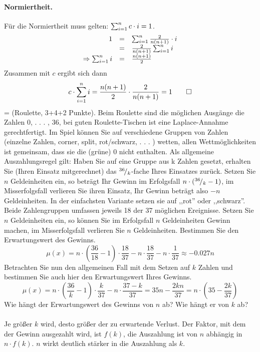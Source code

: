 \documentclass[twoside]{article}
\begin{document}
	\paragraph{Normiertheit.}
	Für die Normiertheit muss gelten: $\sum_{i= 1}^{n}c\cdot i=1$.
	\begin{equation*}
		\begin{array}{rll}
			1 	&=&	\sum_{i= 1}^{n} \frac{2}{n(n+1)}\cdot i\\
				&=&	\frac{2}{n(n+1)}\sum_{i= 1}^{n}i\\
				\Rightarrow \sum_{i= 1}^{n}i	&=& \frac{n(n+1)}{2}
		\end{array}
	\end{equation*}
	Zusammen mit $c$ ergibt sich dann
	\[
		c \cdot \sum_{i= 1}^{n}i = \frac{n(n+1)}{2} \cdot \frac{2}{n(n+1)} = 1 \qed
	\]
\fi
\ifnum\ZettelSechs=\True
{}
(Roulette, 3+4+2 Punkte).
Beim Roulette sind die möglichen Ausgänge die Zahlen {0, . . . , 36}, bei guten Roulette-Tischen ist eine Laplace-Annahme gerechtfertigt.
Im Spiel können Sie auf verschiedene Gruppen von Zahlen (einzelne Zahlen, corner, split, rot/schwarz, . . . ) wetten, allen Wettmöglichkeiten ist gemeinsam, dass sie die (grüne) 0 nicht enthalten.
Als allgemeine Auszahlungsregel gilt: Haben Sie auf eine Gruppe aus k Zahlen gesetzt, erhalten Sie (Ihren Einsatz mitgerechnet) das ${}^{36}\!/_{k}$-fache Ihres Einsatzes zurück.
Setzen Sie $n$ Geldeinheiten ein, so beträgt Ihr Gewinn im Erfolgsfall $n \cdot ({}^{36}\!/_{k}-1)$, im Misserfolgsfall verlieren Sie ihren Einsatz, Ihr Gewinn beträgt also $-n$ Geldeinheiten.
In der einfachsten Variante setzen sie auf ,,rot'' oder ,,schwarz''.
Beide Zahlengruppen umfassen jeweils 18 der 37 möglichen Ereignisse.
Setzen Sie $n$ Geldeinheiten ein, so können Sie im Erfolgsfall $n$ Geldeinheiten Gewinn machen, im Misserfolgsfall verlieren Sie $n$ Geldeinheiten.
Bestimmen Sie den Erwartungswert des Gewinns.
\[
	\mu(x) = n \cdot \left(\frac{36}{18}-1 \right) \cdot \frac{18}{37} - n \cdot \frac{18}{37} - n \cdot \frac{1}{37} \approx -0.027n
\]
Betrachten Sie nun den allgemeinen Fall mit dem Setzen auf $k$ Zahlen und bestimmen Sie auch hier den Erwartungswert Ihres Gewinns.
\[
	\mu(x) = n \cdot \left(\frac{36}{k}-1 \right) \cdot \frac{k}{37} - n \cdot \frac{37-k}{37} = 35n-\frac{2kn}{37} = n \cdot \left(35-\frac{2k}{37} \right)
\]
Wie hängt der Erwartungswert des Gewinns von $n$ ab?
Wie hängt er von $k$ ab?\\
\vspace{.2cm}\\
Je größer $k$ wird, desto größer der zu erwartende Verlust.
Der Faktor, mit dem der Gewinn ausgezahlt wird, ist $f(k)$, die Auszahlung ist von $n$ abhängig in $n \cdot f(k)$.
$n$ wirkt deutlich stärker in die Auszahlung als $k$.
\end{document}
